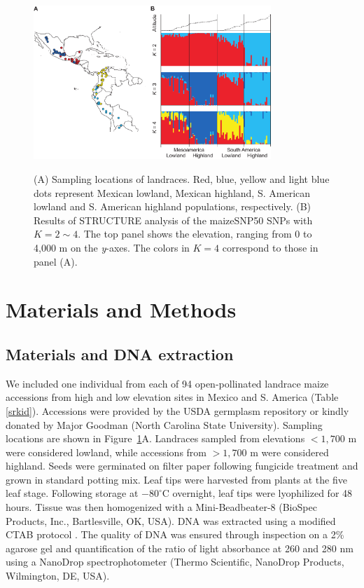 
\begin{figure}[tb]   
  \begin{center}
   \vspace{-0mm}
   \includegraphics[width=0.8\textwidth]{fig/Fig2}
   \renewcommand{\baselinestretch}{0.9}
   \vspace{-3mm}
   \caption{(A) Sampling locations of landraces.  Red, blue, yellow and light blue dots represent Mexican lowland, Mexican highland, S. American lowland and S. American highland populations, respectively.  (B) Results of {\sf STRUCTURE} analysis of the maizeSNP50 SNPs with $K=2\sim4$.  The top panel shows the elevation, ranging from 0 to 4,000 m on the \emph{y}-axes.  The colors in $K=4$ correspond to those in panel (A).    }
\vspace{-6mm}
    \label{map}
  \end{center}
\end{figure}

\section*{Materials and Methods}

\subsection*{Materials and DNA extraction}
We included one individual from each of 94 open-pollinated landrace maize accessions from high and low elevation sites in Mexico and S. America (Table \ref{srkid}).   
Accessions were provided by the USDA germplasm repository or kindly donated by Major Goodman (North Carolina State University).  
Sampling locations are shown in Figure~\ref{map}A.  
Landraces sampled from elevations $<1,700$ m were considered lowland, while accessions from $>1,700$ m were considered highland.  
Seeds were germinated on filter paper following fungicide treatment and grown in standard potting mix.  
Leaf tips were harvested from plants at the five leaf stage.  
Following storage at $-80^{\circ}$C overnight, leaf tips were lyophilized for 48 hours.  
Tissue was then homogenized with a Mini-Beadbeater-8 (BioSpec Products, Inc., Bartlesville, OK, USA).  
DNA was extracted using a modified CTAB protocol \cite[]{CTAB}.  
The quality of DNA was ensured through inspection on a 2\% agarose gel and quantification of the ratio of light absorbance at 260 and 280 nm using a NanoDrop spectrophotometer (Thermo Scientific, NanoDrop Products, Wilmington, DE, USA).

